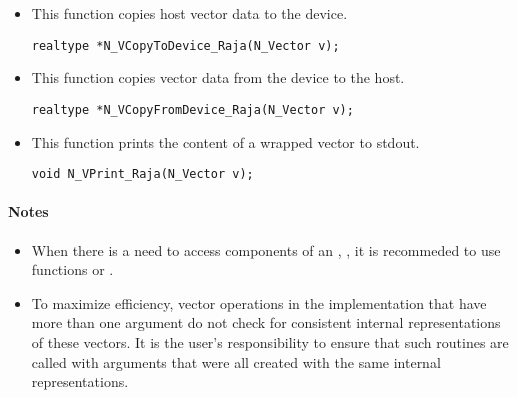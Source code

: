 \begin{itemize}
\item {}
 
 This function copies host vector data to the device.

 \verb|realtype *N_VCopyToDevice_Raja(N_Vector v);|



\item {}
 
 This function copies vector data from the device to the host.

 \verb|realtype *N_VCopyFromDevice_Raja(N_Vector v);|



\item {}
  
  This function prints the content of a wrapped {\raja} vector to stdout.
 
    
  \verb|void N_VPrint_Raja(N_Vector v);|


\end{itemize}
\paragraph{\bf Notes} 
           
\begin{itemize}
                                        
\item
  When there is a need to access components of an , , 
  it is recommeded to use functions  or 
  .        
                                                               

\item
  {\warn}To maximize efficiency, vector operations in the {\nvecraja} implementation
  that have more than one  argument do not check for
  consistent internal representations of these vectors. It is the user's 
  responsibility to ensure that such routines are called with 
  arguments that were all created with the same internal representations.

\end{itemize}

